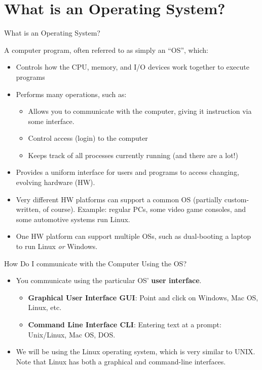 \documentclass[graphics]{beamer}
\begin{document}
\section{What is an Operating System?}
\begin{frame}{What is an Operating System?}
     {
        A computer program, often referred to as simply an ``OS'', which:
        \begin{itemize}
            \item Controls how the CPU, memory, and I/O devices work together to execute programs
            \item Performs many operations, such as:
            \begin{itemize}
                \item Allows you to communicate with the computer, giving it instruction via some interface.
                \item Control access (login) to the computer
                \item Keeps track of all processes currently running (and there are a lot!)
            \end{itemize}
        \end{itemize}
    }
     {
        \begin{itemize}
            \item Provides a uniform interface for users and programs to access changing, evolving hardware (HW).
            \item Very different HW platforms can support a common OS (partially custom-written, of course). Example: regular PCs, some video game consoles, and some automotive systems run Linux.
            \item One HW platform can support multiple OSs, such as dual-booting a laptop to run Linux \textit{or} Windows.
        \end{itemize}
    }
\end{frame}

\begin{frame}{How Do I communicate with the Computer Using the OS?}
    \begin{itemize}
        \item You communicate using the particular OS' \textbf{user interface}.
        \begin{itemize}
            \item \textbf{Graphical User Interface GUI}: Point and click on Windows, Mac OS, Linux, etc.
            \item \textbf{Command Line Interface CLI}: Entering text at a prompt: Unix/Linux, Mac OS, DOS.
        \end{itemize}
        \item We will be using the Linux operating system, which is very similar to UNIX. Note that Linux has both a graphical and command-line interfaces.
    \end{itemize}
\end{frame}
\end{document}
